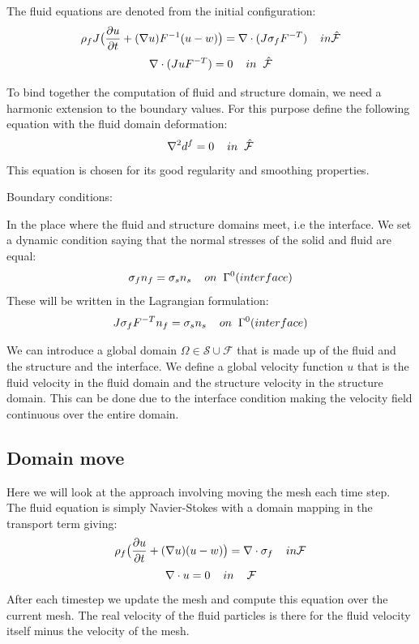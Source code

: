 The fluid equations are denoted from the initial configuration:
$$ \rho_f J \big( \frac{\partial u}{\partial t} + (\nabla u)F^{-1}(u-w)\big) = \nabla \cdot (J\sigma_f F^{-T} )\hspace{4mm} in \mathcal{\hat{F}}$$
$$ \nabla \cdot (J u F^{-T}) = 0 \hspace{4mm} in \hspace{2mm} \mathcal{\hat{F}}$$

To bind together the computation of fluid and structure domain, we need a harmonic extension to the boundary values. For this purpose define the following equation with the fluid domain deformation:
$$ \nabla^2 d^f = 0\hspace{4mm}in \hspace{2mm} \mathcal{\hat{F}}$$
This equation is chosen for its good regularity and smoothing properties.

Boundary conditions:

In the place where the fluid and structure domains meet, i.e the interface. We set a dynamic condition saying that the normal stresses of the solid and fluid are equal:
$$  \sigma_f n_f = \sigma_s n_s \hspace{4mm} on  \hspace{2mm}\Gamma^0 (interface)   $$
These will be written in the Lagrangian formulation:
$$  J\sigma_f F^{-T} n_f = \sigma_s  n_s \hspace{4mm} on  \hspace{2mm}\Gamma^0 (interface)   $$

We can introduce a global domain $\Omega \in \mathcal{S} \cup \mathcal{F} $ that is made up of the fluid and the structure and the interface. We define a global velocity function $u$ that is the fluid velocity in the fluid domain and the structure velocity in the structure domain. This can be done due to the interface condition making the velocity field continuous over the entire domain.  


\subsection*{Domain move}
Here we will look at the approach involving moving the mesh each time step. \\
The fluid equation is simply Navier-Stokes with a domain mapping in the transport term giving:
$$ \rho_f \big( \frac{\partial u}{\partial t} + (\nabla u)(u-w)\big) = \nabla \cdot \sigma_f \hspace{4mm} in \mathcal{F}$$
$$ \nabla \cdot u = 0  \hspace{4mm} in \hspace{4mm} \mathcal{F} $$
After each timestep we update the mesh and compute this equation over the current mesh. The real velocity of the fluid particles is there for the fluid velocity itself minus the velocity of the mesh. 

